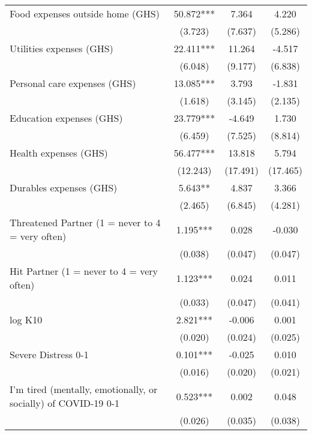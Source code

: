 \begin{ThreePartTable}
\begin{table}[tbp]
\begin{tabular}{lccc}
 Food expenses outside home (GHS) & 50.872*** & 7.364 & 4.220 \\ [0.1em] 
                   &      (3.723)     &      (7.637)     &      (5.286)     \\ [0.1em] 
 Utilities expenses (GHS) & 22.411*** & 11.264 & -4.517 \\ [0.1em] 
                   &      (6.048)     &      (9.177)     &      (6.838)     \\ [0.1em] 
 Personal care expenses (GHS) & 13.085*** & 3.793 & -1.831 \\ [0.1em] 
                   &      (1.618)     &      (3.145)     &      (2.135)     \\ [0.1em] 
 Education expenses (GHS) & 23.779*** & -4.649 & 1.730 \\ [0.1em] 
                   &      (6.459)     &      (7.525)     &      (8.814)     \\ [0.1em] 
 Health expenses (GHS) & 56.477*** & 13.818 & 5.794 \\ [0.1em] 
                   &      (12.243)     &      (17.491)     &      (17.465)     \\ [0.1em] 
 Durables expenses (GHS) & 5.643** & 4.837 & 3.366 \\ [0.1em] 
                   &      (2.465)     &      (6.845)     &      (4.281)     \\ [0.1em] 
 Threatened Partner (1 = never to 4 = very often) & 1.195*** & 0.028 & -0.030 \\ [0.1em] 
                   &      (0.038)     &      (0.047)     &      (0.047)     \\ [0.1em] 
 Hit Partner (1 = never to 4 = very often) & 1.123*** & 0.024 & 0.011 \\ [0.1em] 
                   &      (0.033)     &      (0.047)     &      (0.041)     \\ [0.1em] 
 log K10 & 2.821*** & -0.006 & 0.001 \\ [0.1em] 
                   &      (0.020)     &      (0.024)     &      (0.025)     \\ [0.1em] 
 Severe Distress 0-1 & 0.101*** & -0.025 & 0.010 \\ [0.1em] 
                   &      (0.016)     &      (0.020)     &      (0.021)     \\ [0.1em] 
 I'm tired (mentally, emotionally, or socially) of COVID-19 0-1 & 0.523*** & 0.002 & 0.048 \\ [0.1em] 
                   &      (0.026)     &      (0.035)     &      (0.038)     \\ [0.1em] 

\end{tabular}
\end{table}
\end{ThreePartTable}
